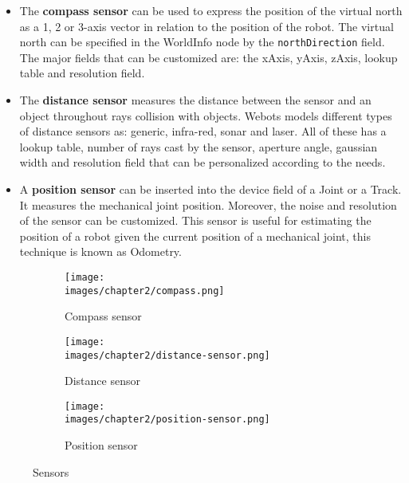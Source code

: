 \begin{itemize}
\item{The \textbf{compass sensor} can be used to express the position of the virtual north as a 1, 2 or 3-axis vector in relation to the position of the robot. The virtual north can be specified in the WorldInfo node by the \verb|northDirection| field. The major fields that can be customized are: the xAxis, yAxis, zAxis, lookup table and resolution field. }
\item{The \textbf{distance sensor} measures the distance between the sensor and an object throughout rays collision with objects. Webots models different types of distance sensors as: generic, infra-red, sonar and laser. All of these has a lookup table, number of rays cast by the sensor, aperture angle, gaussian width and resolution field that can be personalized according to the needs.}
\item{A \textbf{position sensor} can be inserted into the device field of a Joint or a Track. It measures the mechanical joint position. Moreover, the noise and resolution of the sensor can be customized. This sensor is useful for estimating the position of a robot given the current position of a mechanical joint, this technique is known as Odometry.}
\end{itemize}

\begin{figure}[h!]
  \centering
  \begin{subfigure}[b]{0.3\linewidth}
  	\texttt{[image: \\images/chapter2/compass.png]}
  	\caption{Compass sensor}
  	\label{fig:ch-2:compass}
  \end{subfigure}
  \vspace{0.00mm}
  \begin{subfigure}[b]{0.3\linewidth}
  	\texttt{[image: \\images/chapter2/distance-sensor.png]}
  	\caption{Distance sensor}
  	\label{fig:ch-2:distance-sensor}
  \end{subfigure}
  \vspace{0.00mm}
  \begin{subfigure}[b]{0.3\linewidth}
  	\texttt{[image: \\images/chapter2/position-sensor.png]}
  	\caption{Position sensor}
  	\label{fig:ch-2:position-sensor}
  \end{subfigure}
  \vspace{0.00mm}
  \caption{Sensors}
  \label{fig:ch-2:sensors}
\end{figure}

